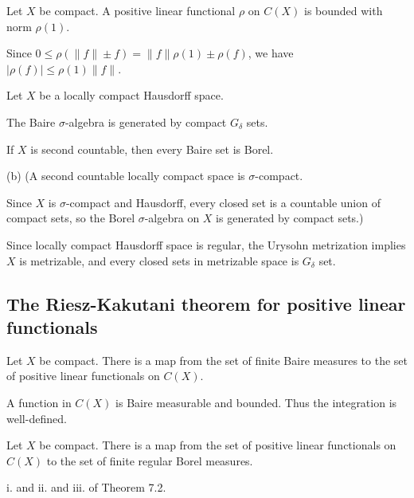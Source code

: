 \documentclass{../note}
\begin{document}
\begin{prb}
Let $X$ be compact.
A positive linear functional $\rho$ on $C(X)$ is bounded with norm $\rho(1)$.
\end{prb}
\begin{pf}
Since $0\le\rho(\|f\|\pm f)=\|f\|\rho(1)\pm\rho(f)$, we have $|\rho(f)|\le\rho(1)\|f\|$.
\end{pf}

\begin{prb}
Let $X$ be a locally compact Hausdorff space.
\begin{parts}
\item The Baire $\sigma$-algebra is generated by compact $G_\delta$ sets.
\item If $X$ is second countable, then every Baire set is Borel.
\end{parts}
\end{prb}
\begin{sol}
(b)
(A second countable locally compact space is $\sigma$-compact.

Since $X$ is $\sigma$-compact and Hausdorff, every closed set is a countable union of compact sets, so the Borel $\sigma$-algebra on $X$ is generated by compact sets.)

Since locally compact Hausdorff space is regular, the Urysohn metrization implies $X$ is metrizable, and every closed sets in metrizable space is $G_\delta$ set.
\end{sol}

\subsection{The Riesz-Kakutani theorem for positive linear functionals}
\begin{prb}
Let $X$ be compact.
There is a map from the set of finite Baire measures to the set of positive linear functionals on $C(X)$.
\end{prb}
\begin{sol}
A function in $C(X)$ is Baire measurable and bounded.
Thus the integration is well-defined.
\end{sol}

\begin{prb}
Let $X$ be compact.
There is a map from the set of positive linear functionals on $C(X)$ to the set of finite regular Borel measures.
\end{prb}
\begin{sol}
i. and ii. and iii. of Theorem 7.2.
\end{sol}
\end{document}

